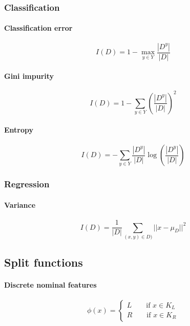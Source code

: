 \documentclass[a4paper,6pt,twocolumn,fleqn]{article}
\begin{document}
\subsubsection{Classification} %
\paragraph{Classification error}
\begin{equation}
    I(D) = 1 - \max_{y \in Y} \frac {|D^y|} {|D|}
\end{equation}
\paragraph{Gini impurity}
\begin{equation}
    I(D) = 1 - \sum_{y \in Y} \left( \frac {|D^y|} {|D|} \right)^2
\end{equation}
\paragraph{Entropy}
\begin{equation}
    I(D) = - \sum_{y \in Y} \frac {|D^y|} {|D|} \log \left( \frac {|D^y|} {|D|} \right)
\end{equation}
\subsubsection{Regression} %
\paragraph{Variance}
\begin{equation}
    I(D) = \frac 1 {|D|} \sum_{(x,y) \in D)} || x - \mu_D ||^2
\end{equation}
\subsection{Split functions} %
\paragraph{Discrete nominal features}
\begin{equation}
    \phi(x) = \begin{cases}
        L \qquad \text{if } x \in K_L\\
        R \qquad \text{if } x \in K_R
    \end{cases}
\end{equation}
\end{document}
